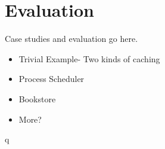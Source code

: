 \section{Evaluation}

Case studies and evaluation go here.
\begin{itemize}
\item Trivial Example- Two kinds of caching
\item Process Scheduler
\item Bookstore
\item More?
\end{itemize}
q
